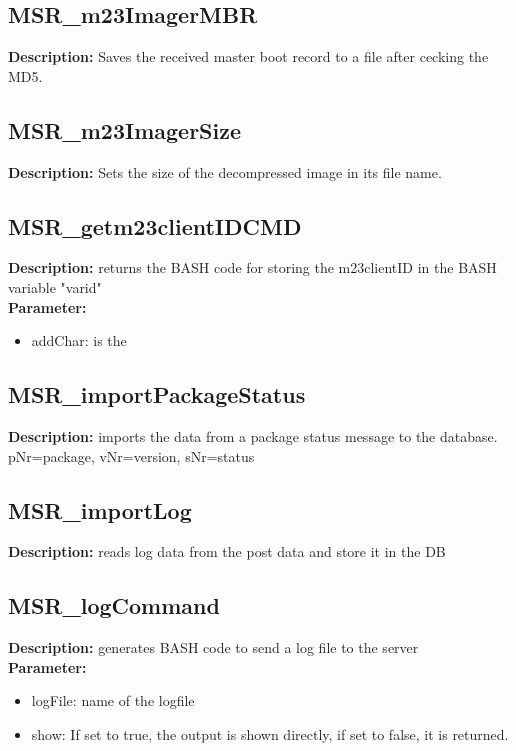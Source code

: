 \subsection{MSR\_m23ImagerMBR}
\textbf{Description:} Saves the received master boot record to a file after cecking the MD5.\\

\subsection{MSR\_m23ImagerSize}
\textbf{Description:} Sets the size of the decompressed image in its file name.\\

\subsection{MSR\_getm23clientIDCMD}
\textbf{Description:} returns the BASH code for storing the m23clientID in the BASH variable "varid"\\
\textbf{Parameter:}
\begin{itemize}
\item addChar: is the 
\end{itemize}

\subsection{MSR\_importPackageStatus}
\textbf{Description:} imports the data from a package status message to the database. pNr=package, vNr=version, sNr=status\\

\subsection{MSR\_importLog}
\textbf{Description:} reads log data from the post data and store it in the DB\\

\subsection{MSR\_logCommand}
\textbf{Description:} generates BASH code to send a log file to the server\\
\textbf{Parameter:}
\begin{itemize}
\item logFile: name of the logfile
\item show: If set to true, the output is shown directly, if set to false, it is returned.
\end{itemize}

